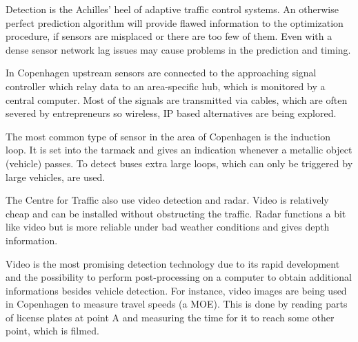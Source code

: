 \label{detection}
Detection is the Achilles' heel of adaptive traffic control systems. An otherwise perfect prediction algorithm will provide flawed information to the optimization procedure, if sensors are misplaced or there are too few of them. Even with a dense sensor network lag issues may cause problems in the prediction and timing.

In Copenhagen upstream sensors are connected to the approaching signal controller which relay data to an area-specific hub, which is monitored by a central computer. Most of the signals are transmitted via cables, which are often severed by entrepreneurs so wireless, IP based alternatives are being explored.

The most common type of sensor in the area of Copenhagen is the induction loop. It is set into the tarmack and gives an indication whenever a metallic object (vehicle) passes. To detect buses extra large loops, which can only be triggered by large vehicles, are used. 

The Centre for Traffic also use video detection and radar. Video is relatively cheap and can be installed without obstructing the traffic. Radar functions a bit like video but is more reliable under bad weather conditions and gives depth information.

Video is the most promising detection technology due to its rapid development and the possibility to perform post-processing on a computer to obtain additional informations besides vehicle detection. For instance, video images are being used in Copenhagen to measure travel speeds (a MOE). This is done by reading parts of license plates at point A and measuring the time for it to reach some other point, which is filmed.